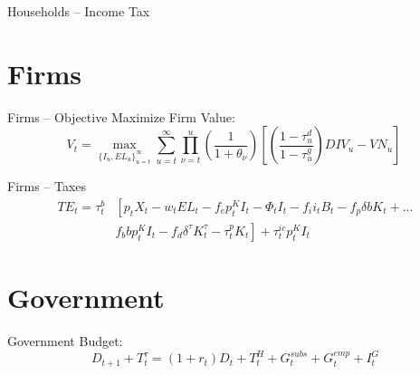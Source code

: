 \documentclass{beamer}
\begin{document}
\begin{frame}{Households -- Income Tax}
  \end{frame}

\section{Firms}
  \begin{frame}{Firms -- Objective}
  Maximize Firm Value: \\
  \begin{equation}
         V_{t}= \max_{\{I_{u},EL_{u}\}^{\infty}_{u=t}}  \sum_{u=t}^{\infty} \prod_{\nu=t}^{u}\left(\frac{1}{1+\theta_{\nu}}\right)\left[ \left(\frac{1-\tau^{d}_{u}}{1-\tau^{g}_{u}}\right)DIV_{u}-VN_{u}\right]\
  \end{equation}
  \end{frame}
  
    \begin{frame}{Firms -- Taxes}
  \begin{equation}
\label{eqn:corp_tax}
\begin{split}
TE_{t}=  \tau^{b}_{t} & \left[  p_{t}X_{t}-w_{t}EL_{t}-f_{e}p^{K}_{t}I_{t}-\Phi_{t}I_{t}-f_{i}i_{t}B_{t}-f_{p}\delta b K_{t}+... \right. \\
 &  \left.  f_{b}bp^{K}_{t}I_{t}-f_{d}\delta^{\tau}K^{\tau}_{t}-\tau^{p}_{t}K_{t}\right] +\tau^{ic}_{t}p^{K}_{t}I_{t}
\end{split}
\end{equation}
 \end{frame}



\section{Government}
  \begin{frame}{Government Budget:}
  \begin{equation}
 \label{eqn:gbc}
      D_{t+1} + T^{\tau}_{t} = (1+r_{t})D_{t} + T^{H}_{t} + G^{subs}_{t} + G^{emp}_{t} + I^{G}_{t}
      \end{equation}
  \end{frame}
\end{document}
